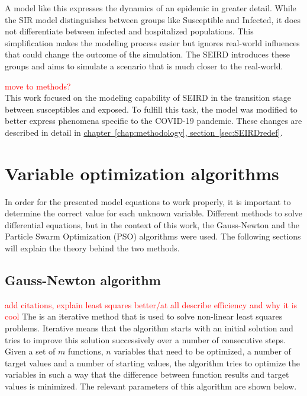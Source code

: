 A model like this expresses the dynamics of an epidemic in greater detail. While the SIR model distinguishes between
groups like Susceptible and Infected, it does not differentiate between infected and hospitalized populations. This simplification
makes the modeling process easier but ignores real-world influences that could change the outcome of the simulation.
The SEIRD introduces these groups and aims to simulate a scenario that is much closer to the real-world.\newline

\textcolor{red}{move to methods?}\\
This work focused on the modeling capability of SEIRD in the transition stage between susceptibles and exposed. To fulfill this
task, the model was modified to better express phenomena specific to the COVID-19 pandemic. These changes are described in detail
in \hyperref[sec:SEIRDredef]{chapter~\ref*{chap:methodology}, section~\ref*{sec:SEIRDredef}}.


\section{Variable optimization algorithms}
In order for the presented model equations to work properly, it is important to determine the correct value for each unknown variable.
Different methods to solve differential equations, but in the context of this work, the Gauss-Newton and the Particle Swarm Optimization (PSO)
algorithms were used. The following sections will explain the theory behind the two methods.


\subsection{Gauss-Newton algorithm}
\textcolor{red}{add citations, explain least squares better/at all}
\textcolor{red}{describe efficiency and why it is cool}
\label{sec:Gauss}
The  is an iterative method that is used to solve non-linear least squares problems. Iterative means that the algorithm 
starts with an initial solution and tries to improve this solution successively over a number of consecutive steps.
Given a set of $m$ functions, $n$ variables that need to be optimized, a number of target values and a number of starting values, the algorithm tries
to optimize the variables in such a way that the difference between function results and target values is minimized.
The relevant parameters of this algorithm are shown below. 

